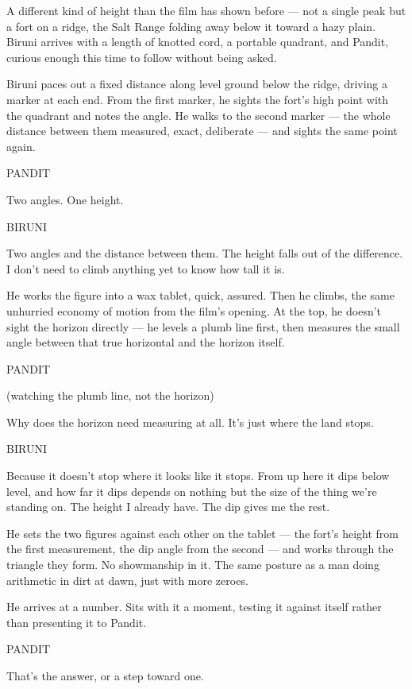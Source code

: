 \documentclass[12pt]{article}
\newcommand{\action}[1]{%
  \par\noindent #1\par\vspace{0.6\baselineskip}%
}
\newcommand{\charcue}[1]{%
  \needspace{3\baselineskip}%
  \par\vspace{0.3\baselineskip}\noindent\hspace*{2.2in}#1\par%
}
\newenvironment{dialogue}{%
  \begin{list}{}{%
    \setlength{\leftmargin}{1.1in}%
    \setlength{\rightmargin}{1.6in}%
    \setlength{\listparindent}{0pt}%
    \setlength{\itemindent}{0pt}%
    \setlength{\parsep}{0pt}%
    \setlength{\itemsep}{0pt}%
    \setlength{\topsep}{0pt}%
  }\item[]%
}{%
  \end{list}\vspace{0.4\baselineskip}%
}
\newcommand{\parenthetical}[1]{%
  \hspace*{-0.4in}\hspace*{1.1in}(#1)\par%
}
\begin{document}
\action{A different kind of height than the film has shown before --- not a single peak but a fort on a ridge, the Salt Range folding away below it toward a hazy plain. Biruni arrives with a length of knotted cord, a portable quadrant, and Pandit, curious enough this time to follow without being asked.}
\action{Biruni paces out a fixed distance along level ground below the ridge, driving a marker at each end. From the first marker, he sights the fort's high point with the quadrant and notes the angle. He walks to the second marker --- the whole distance between them measured, exact, deliberate --- and sights the same point again.}
\charcue{PANDIT}
\begin{dialogue}
Two angles. One height.\\
\end{dialogue}
\charcue{BIRUNI}
\begin{dialogue}
Two angles and the distance between them. The height falls out of the difference. I don't need to climb anything yet to know how tall it is.\\
\end{dialogue}
\action{He works the figure into a wax tablet, quick, assured. Then he climbs, the same unhurried economy of motion from the film's opening. At the top, he doesn't sight the horizon directly --- he levels a plumb line first, then measures the small angle between that true horizontal and the horizon itself.}
\charcue{PANDIT}
\begin{dialogue}
\parenthetical{watching the plumb line, not the horizon}
Why does the horizon need measuring at all. It's just where the land stops.\\
\end{dialogue}
\charcue{BIRUNI}
\begin{dialogue}
Because it doesn't stop where it looks like it stops. From up here it dips below level, and how far it dips depends on nothing but the size of the thing we're standing on. The height I already have. The dip gives me the rest.\\
\end{dialogue}
\action{He sets the two figures against each other on the tablet --- the fort's height from the first measurement, the dip angle from the second --- and works through the triangle they form. No showmanship in it. The same posture as a man doing arithmetic in dirt at dawn, just with more zeroes.}
\action{He arrives at a number. Sits with it a moment, testing it against itself rather than presenting it to Pandit.}
\charcue{PANDIT}
\begin{dialogue}
That's the answer, or a step toward one.\\
\end{dialogue}
\end{document}
